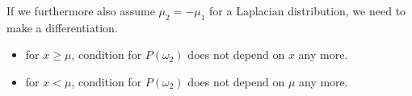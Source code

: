 \documentclass[paper=a4,fontsize=10pt,DIV11,BCOR10mm]{scrartcl}
\begin{document}
If we furthermore also assume $\mu_2 = -\mu_1$ for a Laplacian distribution, we need to make a differentiation.
	\begin{itemize}
		\item for $x\geq \mu$, condition for $P(\omega_2)$ does not depend on $x$ any more.
		\item for $x < \mu$, condition for $P(\omega_2)$ does not depend on $\mu$ any more.
	\end{itemize}



\end{document}
